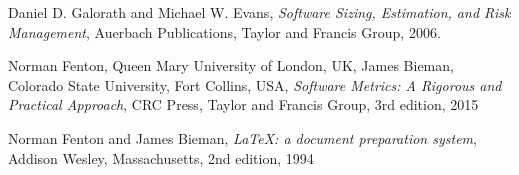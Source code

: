 \begin{thebibliography}{9}

Daniel D. Galorath and Michael W. Evans, \emph{Software Sizing, Estimation, and Risk 	Management}, Auerbach Publications, Taylor and Francis Group, 2006.
  
Norman Fenton, Queen Mary University of London, UK, James Bieman, Colorado State University, Fort Collins, USA, \emph{Software Metrics: A Rigorous and Practical Approach}, CRC Press, Taylor and Francis Group, 3rd edition, 2015
  
  
Norman Fenton and James Bieman,
\emph{\LaTeX: a document preparation system},
  Addison Wesley, Massachusetts,
  2nd edition,
  1994

\end{thebibliography}
